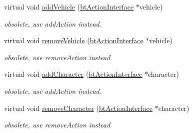 \begin{DoxyCompactItemize}
\item 
\hypertarget{classbt_dynamics_world_ab897455739081304249e7af787cafa19}{virtual void \hyperlink{classbt_dynamics_world_ab897455739081304249e7af787cafa19}{add\+Vehicle} (\hyperlink{classbt_action_interface}{bt\+Action\+Interface} $\ast$vehicle)}\label{classbt_dynamics_world_ab897455739081304249e7af787cafa19}

\begin{DoxyCompactList}\small\item\em obsolete, use add\+Action instead. \end{DoxyCompactList}\item 
\hypertarget{classbt_dynamics_world_abb361ed4e22766cd79d22ece3f5869e6}{virtual void \hyperlink{classbt_dynamics_world_abb361ed4e22766cd79d22ece3f5869e6}{remove\+Vehicle} (\hyperlink{classbt_action_interface}{bt\+Action\+Interface} $\ast$vehicle)}\label{classbt_dynamics_world_abb361ed4e22766cd79d22ece3f5869e6}

\begin{DoxyCompactList}\small\item\em obsolete, use remove\+Action instead \end{DoxyCompactList}\item 
\hypertarget{classbt_dynamics_world_a56e16159fdff1311706d4b73e0999e02}{virtual void \hyperlink{classbt_dynamics_world_a56e16159fdff1311706d4b73e0999e02}{add\+Character} (\hyperlink{classbt_action_interface}{bt\+Action\+Interface} $\ast$character)}\label{classbt_dynamics_world_a56e16159fdff1311706d4b73e0999e02}

\begin{DoxyCompactList}\small\item\em obsolete, use add\+Action instead. \end{DoxyCompactList}\item 
\hypertarget{classbt_dynamics_world_ae4daeac0b98e39a80bb960c5b995fd2a}{virtual void \hyperlink{classbt_dynamics_world_ae4daeac0b98e39a80bb960c5b995fd2a}{remove\+Character} (\hyperlink{classbt_action_interface}{bt\+Action\+Interface} $\ast$character)}\label{classbt_dynamics_world_ae4daeac0b98e39a80bb960c5b995fd2a}

\begin{DoxyCompactList}\small\item\em obsolete, use remove\+Action instead \end{DoxyCompactList}\end{DoxyCompactItemize}
